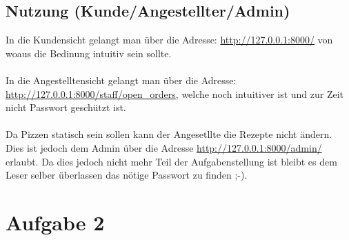 \documentclass[a4paper]{report}
\begin{document}
\subsection*{Nutzung (Kunde/Angestellter/Admin)}

In die Kundensicht gelangt man über die Adresse: \url{http://127.0.0.1:8000/} von woaus die Bedinung intuitiv sein sollte.\\ \\

In die Angestelltensicht gelangt man über die Adresse: \url{http://127.0.0.1:8000/staff/open_orders}, welche noch intuitiver ist und zur Zeit nicht Passwort geschützt ist.\\ \\

Da Pizzen statisch sein sollen kann der Angesetllte die Rezepte nicht ändern. Dies ist jedoch dem Admin über die Adresse \url{http://127.0.0.1:8000/admin/} erlaubt. Da dies jedoch nicht mehr Teil der Aufgabenstellung ist bleibt es dem Leser selber überlassen das nötige Passwort zu finden ;-).


\newpage
\section*{Aufgabe 2}
\end{document}
